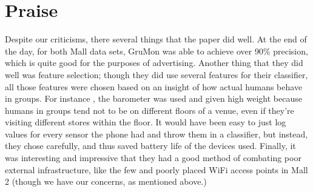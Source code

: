\documentclass[a4paper]{article}
\begin{document}
\section{Praise}
Despite our criticisms, there several things that the paper did well. At the end
of the day, for both Mall data sets, GruMon was able to achieve over 90\%
precision, which is quite good for the purposes of advertising. Another thing
that they did well was feature selection; though they did use several features
for their classifier, all those features were chosen based on an insight of how
actual humans behave in groups. For instance , the barometer was used and given
high weight because humans in groups tend not to be on different floors of a
venue, even if they're visiting different stores within the floor. It would have
been easy to just log values for every sensor the phone had and throw them in a
classifier, but instead, they chose carefully, and thus saved battery life of
the devices used. Finally, it was interesting and impressive that they had a
good method of combating poor external infrastructure, like the few and poorly
placed WiFi access points in Mall 2 (though we have our concerns, as mentioned
above.)
\end{document}
